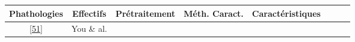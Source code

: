 \documentclass[12pt,]{article}
\begin{document}
\begin{landscape}
\begin{longtable}[]{@{}ccccclll@{}}
\begin{minipage}[b]{0.11\columnwidth}
Phathologies\strut
\end{minipage} & \begin{minipage}[b]{0.08\columnwidth}\centering
Effectifs\strut
\end{minipage} & \begin{minipage}[b]{0.09\columnwidth}\raggedright
Prétraitement\strut
\end{minipage} & \begin{minipage}[b]{0.08\columnwidth}\raggedright
Méth. Caract.\strut
\end{minipage} & \begin{minipage}[b]{0.11\columnwidth}\raggedright
Caractéristiques\strut
\end{minipage}\tabularnewline
\midrule
\endhead
\begin{minipage}[t]{0.14\columnwidth}\centering
{[}\protect\hyperlink{ref-you1994expiratory}{51}{]}\strut
\end{minipage} & \begin{minipage}[t]{0.09\columnwidth}\centering
You \& al.\strut
\end{minipage} & \begin{minipage}[t]{0.08\columnwidth}\centering
1994\strut
\end{minipage} & \begin{minipage}[t]{0.11\columnwidth}\centering
\strut
\end{minipage} & \begin{minipage}[t]{0.08\columnwidth}\centering
\strut
\end{minipage} & \begin{minipage}[t]{0.09\columnwidth}\raggedright
\strut
\end{minipage} & \begin{minipage}[t]{0.08\columnwidth}\raggedright
\strut
\end{minipage} & \begin{minipage}[t]{0.11\columnwidth}\raggedright
\strut
\end{minipage}\tabularnewline
\bottomrule
\end{longtable}

\end{landscape}
\end{document}
